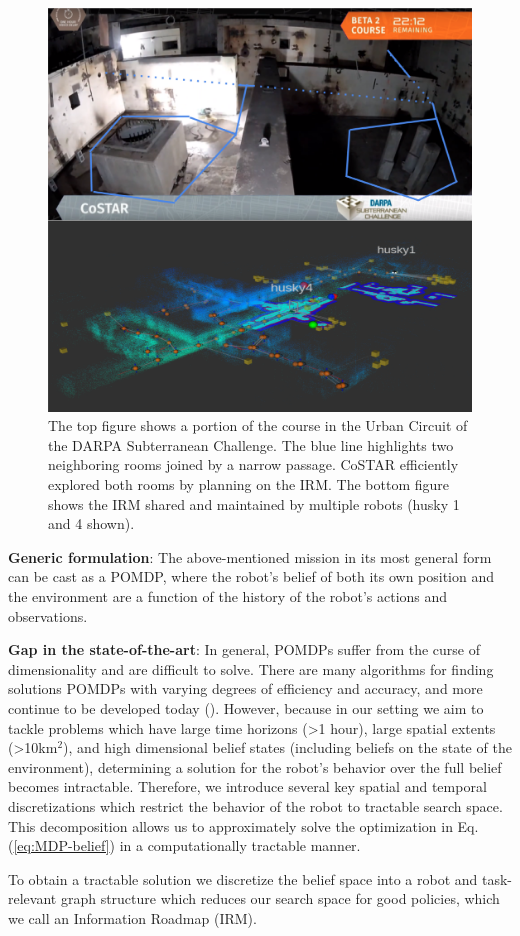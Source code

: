 \documentclass[letterpaper, 10 pt, conference]{ieeeconf}  %
\newcommand{\ph}[1]{{\textbf{#1}:}} %
\begin{document}
\begin{figure}[t!]
  \centering
  \includegraphics[width=.48\textwidth]{figures/firstpage_v2.png}
  \caption{The top figure shows a portion of the course in the Urban Circuit of the DARPA Subterranean Challenge. The blue line highlights two neighboring rooms joined by a narrow passage. CoSTAR efficiently explored both rooms by planning on the IRM. The bottom figure shows the IRM shared and maintained by multiple robots (husky 1 and 4 shown).}
  \label{fig:firstPage}
\end{figure}


\ph{Generic formulation}
The above-mentioned mission in its most general form can be cast as a POMDP, where the robot's belief of both its own position and the environment are a function of the history of the robot's actions and observations.  

\ph{Gap in the state-of-the-art}
In general, POMDPs suffer from the curse of dimensionality and are difficult to solve.  There are many algorithms for finding solutions POMDPs with varying degrees of efficiency and accuracy, and more continue to be developed today (\cite{silver2010monte,somani2013despot,bonet1998learning,kim2019pomhdp}).  However, because in our setting we aim to tackle problems which have large time horizons (>1 hour), large spatial extents (>10km$^2$), and high dimensional belief states (including beliefs on the state of the environment), determining a solution for the robot's behavior over the full belief becomes intractable.  Therefore, we introduce several key spatial and temporal discretizations which restrict the behavior of the robot to tractable search space.  This decomposition allows us to approximately solve the optimization in Eq. (\ref{eq:MDP-belief}) in a computationally tractable manner.

To obtain a tractable solution we discretize the belief space into a robot and task-relevant graph structure which reduces our search space for good policies, which we call an Information Roadmap (IRM).
\end{document}
